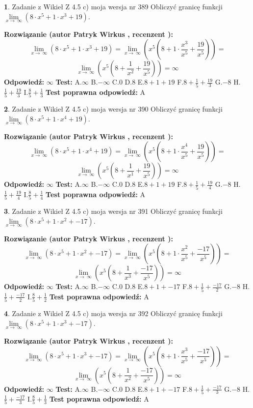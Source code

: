 \documentclass[12pt, a4paper]{article}
\theoremstyle{definition} %
\newtheorem{zad}{}
\newcommand{\zadStart}[1]{\begin{zad}#1\newline}
\newcommand{\zadStop}{\end{zad}}
\newcommand{\rozwStart}[2]{\noindent \textbf{Rozwiązanie (autor #1 , recenzent #2): }\newline}
\newcommand{\rozwStop}{\newline}
\newcommand{\odpStart}{\noindent \textbf{Odpowiedź:}\newline}
\newcommand{\odpStop}{\newline}
\newcommand{\testStart}{\noindent \textbf{Test:}\newline}
\newcommand{\testStop}{\newline}
\newcommand{\kluczStart}{\noindent \textbf{Test poprawna odpowiedź:}\newline}
\newcommand{\kluczStop}{\newline}
\begin{document}
\zadStart{Zadanie z Wikieł Z 4.5 c) moja wersja nr 389}
Obliczyć granicę funkcji  $\lim\limits_{x\to\ \infty}(8 \cdot x^{5}+1 \cdot x^{3}+19)$.
\zadStop
\rozwStart{Patryk Wirkus}{}
$$\lim\limits_{x\to\ \infty}(8 \cdot x^{5}+1 \cdot x^{3}+19) = \lim\limits_{x\to\ \infty}(x^{5}(8 +1 \cdot \frac{x^{3}}{x^{5}}+\frac{19}{x^{5}})) =$$ $$\lim\limits_{x\to\ \infty}(x^{5}(8 +\frac{1}{x^{2}}+\frac{19}{x^{5}})) =\infty$$
\rozwStop
\odpStart
$\infty$
\odpStop
\testStart
A.$\infty$ B.$-\infty$ C.$0$ D.$8$ E.$8 + 1 + 19$
F.$8+\frac{1}{5}+\frac{19}{3}$ G.$-8$
H.$\frac{1}{5}+\frac{19}{3}$
I.$\frac{8}{5}+\frac{1}{3}$
\testStop
\kluczStart
A
\kluczStop



\zadStart{Zadanie z Wikieł Z 4.5 c) moja wersja nr 390}
Obliczyć granicę funkcji  $\lim\limits_{x\to\ \infty}(8 \cdot x^{5}+1 \cdot x^{4}+19)$.
\zadStop
\rozwStart{Patryk Wirkus}{}
$$\lim\limits_{x\to\ \infty}(8 \cdot x^{5}+1 \cdot x^{4}+19) = \lim\limits_{x\to\ \infty}(x^{5}(8 +1 \cdot \frac{x^{4}}{x^{5}}+\frac{19}{x^{5}})) =$$ $$\lim\limits_{x\to\ \infty}(x^{5}(8 +\frac{1}{x^{1}}+\frac{19}{x^{5}})) =\infty$$
\rozwStop
\odpStart
$\infty$
\odpStop
\testStart
A.$\infty$ B.$-\infty$ C.$0$ D.$8$ E.$8 + 1 + 19$
F.$8+\frac{1}{5}+\frac{19}{4}$ G.$-8$
H.$\frac{1}{5}+\frac{19}{4}$
I.$\frac{8}{5}+\frac{1}{4}$
\testStop
\kluczStart
A
\kluczStop



\zadStart{Zadanie z Wikieł Z 4.5 c) moja wersja nr 391}
Obliczyć granicę funkcji  $\lim\limits_{x\to\ \infty}(8 \cdot x^{5}+1 \cdot x^{2}+-17)$.
\zadStop
\rozwStart{Patryk Wirkus}{}
$$\lim\limits_{x\to\ \infty}(8 \cdot x^{5}+1 \cdot x^{2}+-17) = \lim\limits_{x\to\ \infty}(x^{5}(8 +1 \cdot \frac{x^{2}}{x^{5}}+\frac{-17}{x^{5}})) =$$ $$\lim\limits_{x\to\ \infty}(x^{5}(8 +\frac{1}{x^{3}}+\frac{-17}{x^{5}})) =\infty$$
\rozwStop
\odpStart
$\infty$
\odpStop
\testStart
A.$\infty$ B.$-\infty$ C.$0$ D.$8$ E.$8 + 1 + -17$
F.$8+\frac{1}{5}+\frac{-17}{2}$ G.$-8$
H.$\frac{1}{5}+\frac{-17}{2}$
I.$\frac{8}{5}+\frac{1}{2}$
\testStop
\kluczStart
A
\kluczStop



\zadStart{Zadanie z Wikieł Z 4.5 c) moja wersja nr 392}
Obliczyć granicę funkcji  $\lim\limits_{x\to\ \infty}(8 \cdot x^{5}+1 \cdot x^{3}+-17)$.
\zadStop
\rozwStart{Patryk Wirkus}{}
$$\lim\limits_{x\to\ \infty}(8 \cdot x^{5}+1 \cdot x^{3}+-17) = \lim\limits_{x\to\ \infty}(x^{5}(8 +1 \cdot \frac{x^{3}}{x^{5}}+\frac{-17}{x^{5}})) =$$ $$\lim\limits_{x\to\ \infty}(x^{5}(8 +\frac{1}{x^{2}}+\frac{-17}{x^{5}})) =\infty$$
\rozwStop
\odpStart
$\infty$
\odpStop
\testStart
A.$\infty$ B.$-\infty$ C.$0$ D.$8$ E.$8 + 1 + -17$
F.$8+\frac{1}{5}+\frac{-17}{3}$ G.$-8$
H.$\frac{1}{5}+\frac{-17}{3}$
I.$\frac{8}{5}+\frac{1}{3}$
\testStop
\kluczStart
A
\kluczStop
\end{document}
